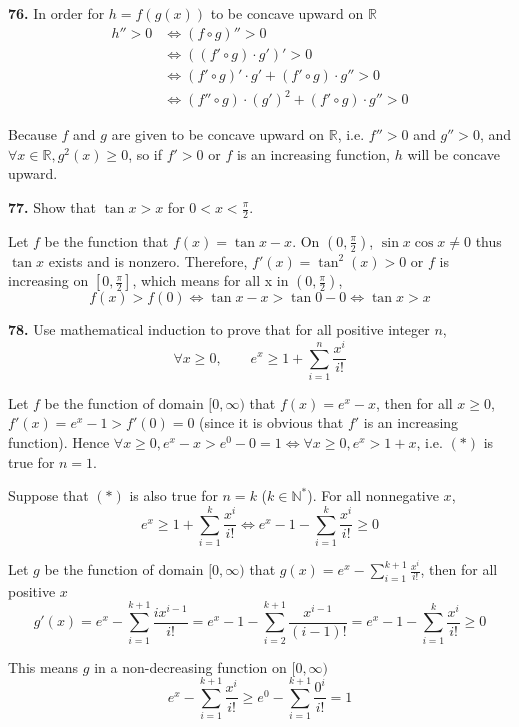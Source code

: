 \documentclass[a4paper,12pt]{article}
\begin{document}
\pagebreak\noindent\textbf{76. }In order for $h = f(g(x))$ to be concave
upward on $\mathbb R$
\begin{align*}
  h'' > 0 &\iff (f \circ g)'' > 0\\
          &\iff ((f' \circ g) \cdot g')' > 0\\
          &\iff (f' \circ g)' \cdot g' + (f' \circ g) \cdot g'' > 0\\
          &\iff (f'' \circ g) \cdot (g')^2 + (f' \circ g) \cdot g'' > 0
\end{align*}

Because $f$ and $g$ are given to be concave upward on $\mathbb R$, i.e.
$f'' > 0$ and $g'' > 0$, and $\forall x \in \mathbb R, g^2(x) \geq 0$, so if
$f' > 0$ or $f$ is an increasing function, $h$ will be concave upward.

\noindent\textbf{77. }Show that $\tan{x} > x$ for $0 < x < \frac{\pi}{2}$.

Let $f$ be the function that $f(x) = \tan{x} - x$. On $(0, \frac{\pi}{2})$,
$\sin{x}\cos{x} \neq 0$ thus $\tan{x}$ exists and is nonzero. Therefore,
$f'(x) = \tan^2(x) > 0$ or $f$ is increasing on $[0, \frac{\pi}{2}]$, which
means for all x in $(0, \frac{\pi}{2})$,
\[f(x) > f(0) \iff \tan{x} - x > \tan0 - 0 \iff \tan{x} > x\]

\noindent\textbf{78. } Use mathematical induction to prove that for all
positive integer $n$,
\[\forall x \geq 0, \qquad e^x \geq 1 + \sum_{i=1}^n\frac{x^i}{i!}\tag{$*$}\]

Let $f$ be the function of domain $[0, \infty)$ that $f(x) = e^x - x$, then
for all $x \geq 0$, $f'(x) = e^x - 1 > f'(0) = 0$ (since it is obvious that $f'$
is an increasing function). Hence
$\forall x \geq 0, e^x - x > e^0 - 0 = 1 \iff \forall x \geq 0, e^x > 1 + x$,
i.e.  $(*)$ is true for $n = 1$.

Suppose that $(*)$ is also true for $n = k$ ($k \in \mathbb N^*$). For all
nonnegative $x$,
\[e^x \geq 1 + \sum_{i=1}^k\frac{x^i}{i!}
  \iff e^x - 1 - \sum_{i=1}^k\frac{x^i}{i!} \geq 0\]

Let $g$ be the function of domain $[0, \infty)$ that
$g(x) = e^x - \sum_{i=1}^{k+1}\frac{x^{i}}{i!}$, then for all positive $x$
\[g'(x) = e^x - \sum_{i=1}^{k+1}\frac{ix^{i-1}}{i!}
        = e^x - 1 - \sum_{i=2}^{k+1}\frac{x^{i-1}}{(i - 1)!}
        = e^x - 1 - \sum_{i=1}^{k}\frac{x^{i}}{i!} \geq 0\]

This means $g$ in a non-decreasing function on $[0, \infty)$
\[e^x - \sum_{i=1}^{k+1}\frac{x^{i}}{i!}
  \geq e^0 - \sum_{i=1}^{k+1}\frac{0^{i}}{i!} = 1\]
\end{document}
